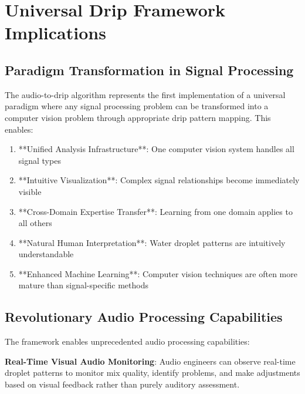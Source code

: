\documentclass[12pt,a4paper]{article}
\begin{document}
\section{Universal Drip Framework Implications}

\subsection{Paradigm Transformation in Signal Processing}

The audio-to-drip algorithm represents the first implementation of a universal paradigm where any signal processing problem can be transformed into a computer vision problem through appropriate drip pattern mapping. This enables:

\begin{enumerate}
\item **Unified Analysis Infrastructure**: One computer vision system handles all signal types
\item **Intuitive Visualization**: Complex signal relationships become immediately visible
\item **Cross-Domain Expertise Transfer**: Learning from one domain applies to all others
\item **Natural Human Interpretation**: Water droplet patterns are intuitively understandable
\item **Enhanced Machine Learning**: Computer vision techniques are often more mature than signal-specific methods
\end{enumerate}

\subsection{Revolutionary Audio Processing Capabilities}

The framework enables unprecedented audio processing capabilities:

\textbf{Real-Time Visual Audio Monitoring}: Audio engineers can observe real-time droplet patterns to monitor mix quality, identify problems, and make adjustments based on visual feedback rather than purely auditory assessment.
\end{document}
